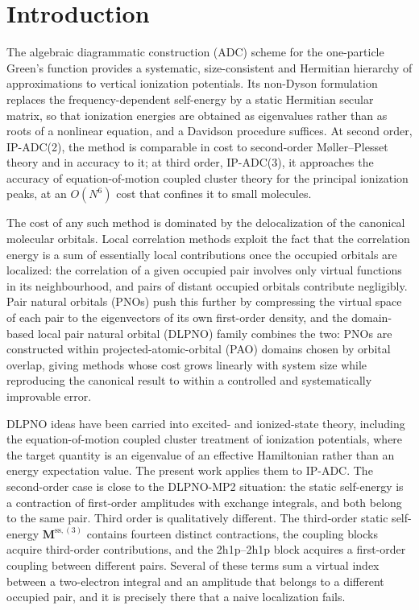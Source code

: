 \documentclass[aip,jcp,amsmath,amssymb,preprint,superscriptaddress]{revtex4-2}%
\begin{document}
\section{Introduction}

The algebraic diagrammatic construction (ADC) scheme for the one-particle
Green's function provides a systematic, size-consistent and Hermitian
hierarchy of approximations to vertical ionization
potentials.\cite{Schirmer1982,Schirmer1983,Trofimov2005,Dreuw2015} Its
non-Dyson formulation replaces the frequency-dependent self-energy by a static
Hermitian secular matrix, so that ionization energies are obtained as
eigenvalues rather than as roots of a nonlinear equation, and a Davidson
procedure suffices. At second order, IP-ADC(2), the method is comparable in
cost to second-order M{\o}ller--Plesset theory and in accuracy to it; at third
order, IP-ADC(3), it approaches the accuracy of equation-of-motion coupled
cluster theory for the principal ionization
peaks,\cite{Trofimov2005,Dreuw2015} at an $O(N^6)$ cost that confines it to
small molecules.

The cost of any such method is dominated by the delocalization of the
canonical molecular orbitals. Local correlation
methods\cite{Pulay1983,Saebo1993} exploit the fact that the correlation energy
is a sum of essentially local contributions once the occupied orbitals are
localized: the correlation of a given occupied pair involves only virtual
functions in its neighbourhood, and pairs of distant occupied orbitals
contribute negligibly. Pair natural orbitals (PNOs) push this further by
compressing the virtual space of each pair to the eigenvectors of its own
first-order density,\cite{Neese2009} and the domain-based local pair natural
orbital (DLPNO) family combines the two: PNOs are constructed within
projected-atomic-orbital (PAO) domains chosen by orbital overlap, giving
methods whose cost grows linearly with system size while reproducing the
canonical result to within a controlled and systematically improvable
error.\cite{Riplinger2013a,Riplinger2013b,Pinski2015,Riplinger2016}

DLPNO ideas have been carried into excited- and ionized-state theory,
including the equation-of-motion coupled cluster treatment of ionization
potentials,\cite{Dutta2018} where the target quantity is an eigenvalue of an
effective Hamiltonian rather than an energy expectation value. The present
work applies them to IP-ADC. The second-order case is close to the
DLPNO-MP2 situation: the static self-energy is a contraction of first-order
amplitudes with exchange integrals, and both belong to the same pair.
Third order is qualitatively different. The third-order static self-energy
$\mathbf{M}^{\text{ss},(3)}$ contains fourteen distinct contractions, the coupling blocks
acquire third-order contributions, and the 2h1p--2h1p block acquires a
first-order coupling between different pairs. Several of these terms sum a
virtual index between a two-electron integral and an amplitude that belongs to
a different occupied pair, and it is precisely there that a naive
localization fails.
\end{document}
